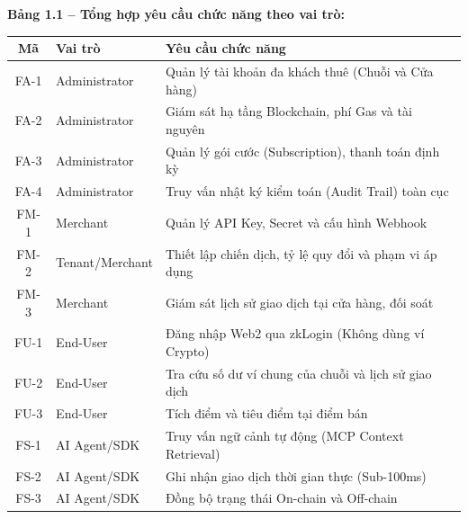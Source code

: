 \vspace{0.5cm}
\textbf{Bảng 1.1 -- Tổng hợp yêu cầu chức năng theo vai trò:}
\begin{table}[H]
    \centering
    \renewcommand{\arraystretch}{1.3}
    \begin{tabular}{|c|l|p{8cm}|}
        \hline
        \textbf{Mã} & \textbf{Vai trò} & \textbf{Yêu cầu chức năng} \\ \hline
        FA-1 & Administrator & Quản lý tài khoản đa khách thuê (Chuỗi và Cửa hàng) \\ \hline
        FA-2 & Administrator & Giám sát hạ tầng Blockchain, phí Gas và tài nguyên \\ \hline
        FA-3 & Administrator & Quản lý gói cước (Subscription), thanh toán định kỳ \\ \hline
        FA-4 & Administrator & Truy vấn nhật ký kiểm toán (Audit Trail) toàn cục \\ \hline
        FM-1 & Merchant & Quản lý API Key, Secret và cấu hình Webhook \\ \hline
        FM-2 & Tenant/Merchant & Thiết lập chiến dịch, tỷ lệ quy đổi và phạm vi áp dụng \\ \hline
        FM-3 & Merchant & Giám sát lịch sử giao dịch tại cửa hàng, đối soát \\ \hline
        FU-1 & End-User & Đăng nhập Web2 qua zkLogin (Không dùng ví Crypto) \\ \hline
        FU-2 & End-User & Tra cứu số dư ví chung của chuỗi và lịch sử giao dịch \\ \hline
        FU-3 & End-User & Tích điểm và tiêu điểm tại điểm bán \\ \hline
        FS-1 & AI Agent/SDK & Truy vấn ngữ cảnh tự động (MCP Context Retrieval) \\ \hline
        FS-2 & AI Agent/SDK & Ghi nhận giao dịch thời gian thực (Sub-100ms) \\ \hline
        FS-3 & AI Agent/SDK & Đồng bộ trạng thái On-chain và Off-chain \\ \hline
    \end{tabular}
    \label{tab:yeu_cau_chuc_nang}
\end{table}
